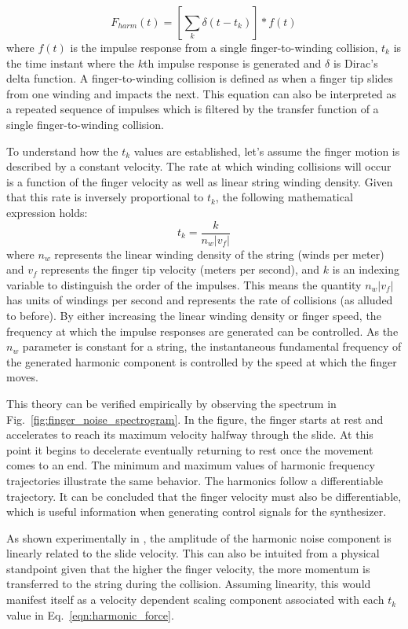 \documentclass[main.tex]{subfiles}
\begin{document}
\begin{equation}
    F_{harm}(t) = \left[\sum_k \delta(t-t_k)\right] \ast f(t)
    \label{eqn:harmonic_force}
\end{equation}
where $f(t)$ is the impulse response from a single finger-to-winding collision, $t_k$ is the time instant where the $k$th impulse response is generated and $\delta$ is Dirac's delta function. A finger-to-winding collision is defined as when a finger tip slides from one winding and impacts the next. This equation can also be interpreted as a repeated sequence of impulses which is filtered by the transfer function of a single finger-to-winding collision.

To understand how the $t_k$ values are established, let's assume the finger motion is described by a constant velocity. The rate at which winding collisions will occur is a function of the finger velocity as well as linear string winding density. Given that this rate is inversely proportional to $t_k$, the following mathematical expression holds:
\begin{equation}
    t_k = \frac{k}{n_w |v_f|}
    \label{eqn:t_k}
\end{equation}
where $n_w$ represents the linear winding density of the string (winds per meter) and $v_f$ represents the finger tip velocity (meters per second), and $k$ is an indexing variable to distinguish the order of the impulses. This means the quantity $n_w |v_f|$ has units of windings per second and represents the rate of collisions (as alluded to before). By either increasing the linear winding density or finger speed, the frequency at which the impulse responses are generated can be controlled. As the $n_w$ parameter is constant for a string, the instantaneous fundamental frequency of the generated harmonic component is controlled by the speed at which the finger moves.

This theory can be verified empirically by observing the spectrum in Fig.~\ref{fig:finger_noise_spectrogram}. In the figure, the finger starts at rest and accelerates to reach its maximum velocity halfway through the slide. At this point it begins to decelerate eventually returning to rest once the movement comes to an end. The minimum and maximum values of harmonic frequency trajectories illustrate the same behavior. The harmonics follow a differentiable trajectory. It can be concluded that the finger velocity must also be differentiable, which is useful information when generating control signals for the synthesizer. 

As shown experimentally in , the amplitude of the harmonic noise component is linearly related to the slide velocity. This can also be intuited from a physical standpoint given that the higher the finger velocity, the more momentum is transferred to the string during the collision. Assuming linearity, this would manifest itself as a velocity dependent scaling component associated with each $t_k$ value in Eq.~\ref{eqn:harmonic_force}.
\end{document}
